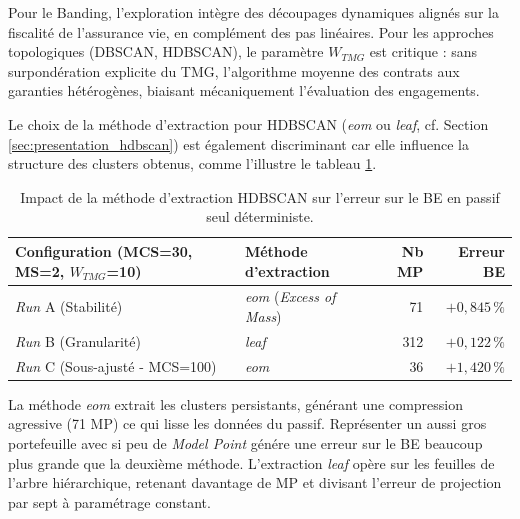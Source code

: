 Pour le Banding, l'exploration intègre des découpages dynamiques alignés sur la fiscalité de l'assurance vie, en complément des pas linéaires. Pour les approches topologiques (DBSCAN, HDBSCAN), le paramètre $W_{TMG}$ est critique : sans surpondération explicite du TMG, l'algorithme moyenne des contrats aux garanties hétérogènes, biaisant mécaniquement l'évaluation des engagements.

Le choix de la méthode d'extraction pour HDBSCAN (\textit{eom} ou \textit{leaf}, cf. Section \ref{sec:presentation_hdbscan}) est également discriminant car elle influence la structure des clusters obtenus, comme l'illustre le tableau \ref{tab:sensibilite_hdbscan_eom_leaf}. 

\begin{table}[H]
    \centering
    \begin{tabular}{|l|l|r|r|}
        \hline
        \textbf{Configuration (MCS=30, MS=2, $W_{TMG}$=10)} & \textbf{Méthode d'extraction} & \textbf{Nb MP} & \textbf{Erreur BE} \\
        \hline
        \textit{Run} A (Stabilité) & \textit{eom} (\textit{Excess of Mass}) & 71 & $+0{,}845\,\%$ \\
        \textit{Run} B (Granularité) & \textit{leaf} & 312 & $+0{,}122\,\%$ \\
        \textit{Run} C (Sous-ajusté - MCS=100) & \textit{eom} & 36 & $+1{,}420\,\%$ \\
        \hline
    \end{tabular}
    \caption{Impact de la méthode d'extraction HDBSCAN sur l'erreur sur le BE en passif seul déterministe.}
    \label{tab:sensibilite_hdbscan_eom_leaf}
\end{table}

La méthode \textit{eom} extrait les clusters persistants, générant une compression agressive (71 MP) ce qui lisse les données du passif. Représenter un aussi gros portefeuille avec si peu de \textit{Model Point} génére une erreur sur le BE beaucoup plus grande que la deuxième méthode. L'extraction \textit{leaf} opère sur les feuilles de l'arbre hiérarchique, retenant davantage de MP et divisant l'erreur de projection par sept à paramétrage constant.

